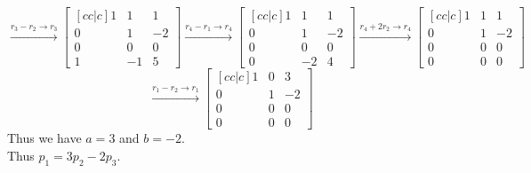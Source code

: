 \documentclass{article}
\begin{document}
$$ \xrightarrow{r_3 - r_2 \rightarrow r_3} \begin{bmatrix}[cc|c]
    1 & 1 & 1\\
    0 & 1 & -2\\
    0 & 0 & 0\\
    1 & -1 & 5
\end{bmatrix} \xrightarrow{r_4 - r_1 \rightarrow r_4} \begin{bmatrix}[cc|c]
    1 & 1 & 1\\
    0 & 1 & -2\\
    0 & 0 & 0\\
    0 & -2 & 4
\end{bmatrix} \xrightarrow{r_4 + 2r_2 \rightarrow r_4} \begin{bmatrix}[cc|c]
    1 & 1 & 1\\
    0 & 1 & -2\\
    0 & 0 & 0\\
    0 & 0 & 0
\end{bmatrix}$$
$$\xrightarrow{r_1 - r_2 \rightarrow r_1} \begin{bmatrix}[cc|c]
    1 & 0 & 3\\
    0 & 1 & -2\\
    0 & 0 & 0\\
    0 & 0 & 0
\end{bmatrix}$$
Thus we have $a = 3$ and $b = -2$.\\
Thus $p_1 = 3p_2 - 2p_3$.
\end{document}
